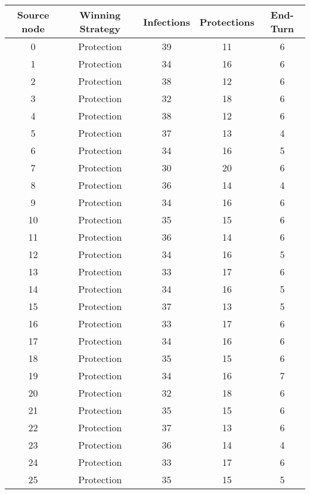 \documentclass[results.tex]{subfiles}
\begin{document}
\begin{center}
  \begin{tabular}{| c || c | c | c | c |}
    \hline
    {\bfseries Source node} & {\bfseries Winning Strategy} & {\bfseries Infections} & {\bfseries Protections} & {\bfseries End-Turn} \\  %
    \hline\hline
    0 & Protection & 39 & 11 & 6 \\ 
    \hline
    1 & Protection & 34 & 16 & 6 \\ 
    \hline
    2 & Protection & 38 & 12 & 6 \\ 
    \hline
    3 & Protection & 32 & 18 & 6 \\ 
    \hline
    4 & Protection & 38 & 12 & 6 \\ 
    \hline
    5 & Protection & 37 & 13 & 4 \\ 
    \hline
    6 & Protection & 34 & 16 & 5 \\ 
    \hline
    7 & Protection & 30 & 20 & 6 \\ 
    \hline
    8 & Protection & 36 & 14 & 4 \\ 
    \hline
    9 & Protection & 34 & 16 & 6 \\ 
    \hline
    10 & Protection & 35 & 15 & 6 \\ 
    \hline
    11 & Protection & 36 & 14 & 6 \\ 
    \hline
    12 & Protection & 34 & 16 & 5 \\ 
    \hline
    13 & Protection & 33 & 17 & 6 \\ 
    \hline
    14 & Protection & 34 & 16 & 5 \\ 
    \hline
    15 & Protection & 37 & 13 & 5 \\ 
    \hline
    16 & Protection & 33 & 17 & 6 \\ 
    \hline
    17 & Protection & 34 & 16 & 6 \\ 
    \hline
    18 & Protection & 35 & 15 & 6 \\ 
    \hline
    19 & Protection & 34 & 16 & 7 \\ 
    \hline
    20 & Protection & 32 & 18 & 6 \\ 
    \hline
    21 & Protection & 35 & 15 & 6 \\ 
    \hline
    22 & Protection & 37 & 13 & 6 \\ 
    \hline
    23 & Protection & 36 & 14 & 4 \\ 
    \hline
    24 & Protection & 33 & 17 & 6 \\ 
    \hline
    25 & Protection & 35 & 15 & 5 \\ 

\end{tabular}
\end{center}
\end{document}
